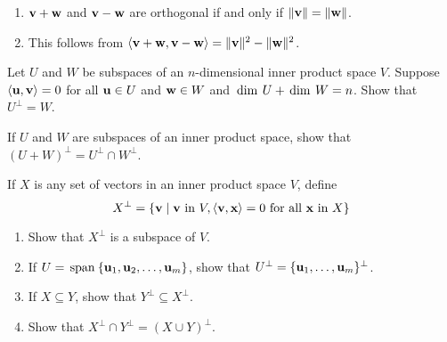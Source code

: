 \begin{multicols}{2}
\begin{ex}
\begin{enumerate}[label={\alph*.}]
\item $\textbf{v} + \textbf{w}$ and $\textbf{v} - \textbf{w}$ are orthogonal if and only if $\|\textbf{v}\| = \|\textbf{w}\|$.

\end{enumerate}
\begin{sol}
\begin{enumerate}[label={\alph*.}]
\setcounter{enumi}{1}
\item  This follows from $\langle \textbf{v} + \textbf{w}, \textbf{v} - \textbf{w} \rangle = \|\textbf{v}\|^{2} - \|\textbf{w}\|^{2}$.

\end{enumerate}
\end{sol}
\end{ex}

\begin{ex}
Let $U$ and $W$ be subspaces of an $n$-dimensional inner product space $V$. Suppose $\langle\textbf{u}, \textbf{v}\rangle = 0$ for all $\textbf{u} \in U$ and $\textbf{w} \in W$ and $\thinspace\operatorname{dim\medspace} U + \thinspace\operatorname{dim\medspace} W = n$. Show that $U^{\perp} = W$.
\end{ex}

\begin{ex}
If $U$ and $W$ are subspaces of an inner product space, show that $(U + W)^{\perp} = U^{\perp} \cap W^{\perp}$.
\end{ex}

\begin{ex}
If $X$ is any set of vectors in an inner product space $V$, define
\begin{equation*}
X^{\perp} = \{\textbf{v} \mid \textbf{v} \mbox{ in } V, \langle\textbf{v}, \textbf{x}\rangle = 0 \mbox{ for all } \textbf{x} \mbox{ in } X\}
\end{equation*}

\begin{enumerate}[label={\alph*.}]
\item Show that $X^{\perp}$ is a subspace of $V$.

\item If $U = \thinspace\operatorname{span\medspace}\{\textbf{u}_{1}, \textbf{u}_{2}, \dots, \textbf{u}_{m}\}$, show that \newline $U^{\perp} = \{\textbf{u}_{1}, \dots, \textbf{u}_{m}\}^{\perp}$.

\item If $X \subseteq Y$, show that $Y^{\perp} \subseteq X^{\perp}$.

\item Show that $X^{\perp} \cap Y^{\perp} = (X \cup Y)^{\perp}$.


\end{enumerate}
\end{ex}
\end{multicols}

